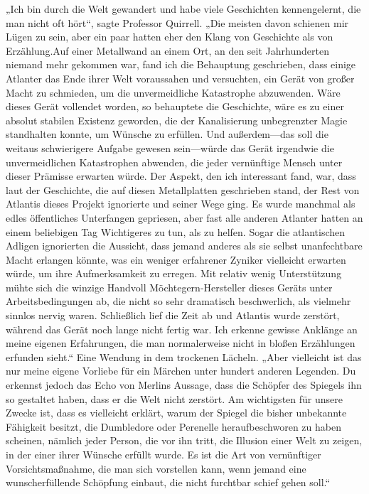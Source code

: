 „Ich bin durch die Welt gewandert und habe viele Geschichten kennengelernt, die man nicht oft hört“, sagte Professor Quirrell. „Die meisten davon schienen mir Lügen zu sein, aber ein paar hatten eher den Klang von Geschichte als von Erzählung.Auf einer Metallwand an einem Ort, an den seit Jahrhunderten niemand mehr gekommen war, fand ich die Behauptung geschrieben, dass einige Atlanter das Ende ihrer Welt voraussahen und versuchten, ein Gerät von großer Macht zu schmieden, um die unvermeidliche Katastrophe abzuwenden. Wäre dieses Gerät vollendet worden, so behauptete die Geschichte, wäre es zu einer absolut stabilen Existenz geworden, die der Kanalisierung unbegrenzter Magie standhalten konnte, um Wünsche zu erfüllen. Und außerdem—das soll die weitaus schwierigere Aufgabe gewesen sein—würde das Gerät irgendwie die unvermeidlichen Katastrophen abwenden, die jeder vernünftige Mensch unter dieser Prämisse erwarten würde. Der Aspekt, den ich interessant fand, war, dass laut der Geschichte, die auf diesen Metallplatten geschrieben stand, der Rest von Atlantis dieses Projekt ignorierte und seiner Wege ging. Es wurde manchmal als edles öffentliches Unterfangen gepriesen, aber fast alle anderen Atlanter hatten an einem beliebigen Tag Wichtigeres zu tun, als zu helfen. Sogar die atlantischen Adligen ignorierten die Aussicht, dass jemand anderes als sie selbst unanfechtbare Macht erlangen könnte, was ein weniger erfahrener Zyniker vielleicht erwarten würde, um ihre Aufmerksamkeit zu erregen. Mit relativ wenig Unterstützung mühte sich die winzige Handvoll Möchtegern-Hersteller dieses Geräts unter Arbeitsbedingungen ab, die nicht so sehr dramatisch beschwerlich, als vielmehr sinnlos nervig waren. Schließlich lief die Zeit ab und Atlantis wurde zerstört, während das Gerät noch lange nicht fertig war. Ich erkenne gewisse Anklänge an meine eigenen Erfahrungen, die man normalerweise nicht in bloßen Erzählungen erfunden sieht.“
Eine Wendung in dem trockenen Lächeln.
„Aber vielleicht ist das nur meine eigene Vorliebe für ein Märchen unter hundert anderen Legenden. Du erkennst jedoch das Echo von Merlins Aussage, dass die Schöpfer des Spiegels ihn so gestaltet haben, dass er die Welt nicht zerstört. Am wichtigsten für unsere Zwecke ist, dass es vielleicht erklärt, warum der Spiegel die bisher unbekannte Fähigkeit besitzt, die Dumbledore oder Perenelle heraufbeschworen zu haben scheinen, nämlich jeder Person, die vor ihn tritt, die Illusion einer Welt zu zeigen, in der einer ihrer Wünsche erfüllt wurde. Es ist die Art von vernünftiger Vorsichtsmaßnahme, die man sich vorstellen kann, wenn jemand eine wunscherfüllende Schöpfung einbaut, die nicht furchtbar schief gehen soll.“

